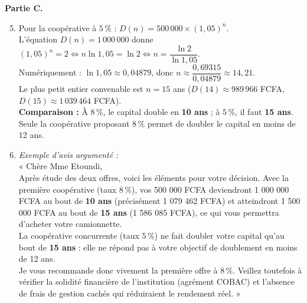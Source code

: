 \documentclass[11pt]{article}
\begin{document}
\begin{exoresolu}
\textbf{Partie C.}
\begin{enumerate}
\setcounter{enumi}{4}
\item Pour la coopérative à $5\,\%$ : $D(n) = 500\,000 \times (1,05)^n$.\\
L'équation $D(n) = 1\,000\,000$ donne $(1,05)^n = 2 \iff n \ln 1,05 = \ln 2 \iff n = \dfrac{\ln 2}{\ln 1,05}$.\\
Numériquement : $\ln 1,05 \approx 0,04879$, donc $n \approx \dfrac{0,69315}{0,04879} \approx 14,21$.\\
Le plus petit entier convenable est \textbf{$n = 15$} ans ($D(14) \approx 989\,966$ FCFA, $D(15) \approx 1\,039\,464$ FCFA).\\
\textbf{Comparaison :} À $8\,\%$, le capital double en \textbf{10 ans} ; à $5\,\%$, il faut \textbf{15 ans}.\\
Seule la coopérative proposant \textbf{$8\,\%$} permet de doubler le capital en moins de 12 ans.
\item \emph{Exemple d'avis argumenté :}\\
« Chère Mme Etoundi, \\
Après étude des deux offres, voici les éléments pour votre décision. Avec la première coopérative (taux $8\,\%$), vos 500 000 FCFA deviendront 1 000 000 FCFA au bout de \textbf{10 ans} (précisément 1 079 462 FCFA) et atteindront 1 500 000 FCFA au bout de \textbf{15 ans} (1 586 085 FCFA), ce qui vous permettra d'acheter votre camionnette. \\
La coopérative concurrente (taux $5\,\%$) ne fait doubler votre capital qu'au bout de \textbf{15 ans} : elle ne répond pas à votre objectif de doublement en moins de 12 ans. \\
Je vous recommande donc vivement la première offre à $8\,\%$. Veillez toutefois à vérifier la solidité financière de l'institution (agrément COBAC) et l'absence de frais de gestion cachés qui réduiraient le rendement réel. »
\end{enumerate}
\end{exoresolu}
\end{document}
